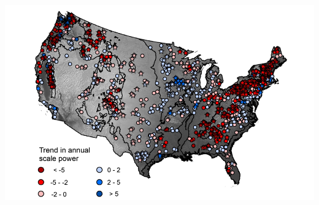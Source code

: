 \documentclass[a4paper,man,biblatex]{apa7}
\begin{document}
 \begin{minipage}{0.5\linewidth}   
     \centering
    \includegraphics[scale=.4]{conus_trend}
\end{minipage}
\end{document}
